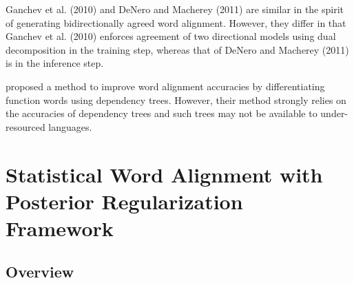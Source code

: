 \documentclass[english]{jnlp_1.4}
\begin{document}
Ganchev et al. (2010) and DeNero and Macherey (2011) are similar in the spirit of generating bidirectionally agreed word alignment.
However, they differ in that Ganchev et al. (2010) enforces agreement of two directional models using dual decomposition in the training step, whereas that of DeNero and Macherey (2011) is in the inference step.

proposed a method to improve word alignment accuracies by differentiating function words using dependency trees.
However, their method strongly relies on the accuracies of dependency trees and such trees may not be available to under-resourced languages.


\section{Statistical Word Alignment with Posterior Regularization Framework}
\label{sec:agreement}

\subsection{Overview}
\end{document}
